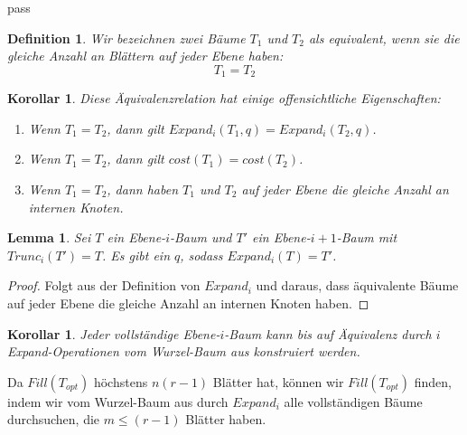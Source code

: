 pass\documentclass[a4paper,10pt,ngerman]{scrartcl}
\newtheorem{definition}[satz]{Definition}
\newtheorem{lemma}[satz]{Lemma}
\newtheorem{korollar}[satz]{Korollar}
\begin{document}
    \begin{definition}
        Wir bezeichnen zwei Bäume $T_1$ und $T_2$ als equivalent, wenn sie die gleiche Anzahl an Blättern auf jeder Ebene haben:
        \[T_1 = T_2\]
    \end{definition}
    \begin{korollar}
        Diese Äquivalenzrelation hat einige offensichtliche Eigenschaften:
        \begin{enumerate}
            \item Wenn $T_1 = T_2$, dann gilt $Expand_i(T_1, q) = Expand_i(T_2, q)$.
            \item Wenn $T_1 = T_2$, dann gilt $cost(T_1) = cost(T_2)$.
            \item Wenn $T_1 = T_2$, dann haben $T_1$ und $T_2$ auf jeder Ebene die gleiche Anzahl an internen Knoten.
        \end{enumerate}
    \end{korollar}
    \begin{lemma}
        Sei $T$ ein Ebene-$i$-Baum und $T'$ ein Ebene-$i+1$-Baum mit $Trunc_i(T') = T$.
        Es gibt ein $q$, sodass $Expand_i(T) = T'$.
    \end{lemma}
    \begin{proof}
        Folgt aus der Definition von $Expand_i$ und daraus, dass äquivalente Bäume auf jeder Ebene die gleiche Anzahl an internen Knoten haben.
    \end{proof}
    \begin{korollar}
        \label{lem:funktioniert}
        Jeder vollständige Ebene-$i$-Baum kann bis auf Äquivalenz durch $i$ Expand-Operationen vom Wurzel-Baum aus konstruiert werden.
    \end{korollar}
    Da $Fill(T_{opt})$ höchstens $n (r -1)$ Blätter hat, können wir $Fill(T_{opt})$ finden, indem wir vom Wurzel-Baum aus
    durch $Expand_i$ alle vollständigen Bäume durchsuchen, die $m \le (r - 1)$ Blätter haben.
\end{document}
